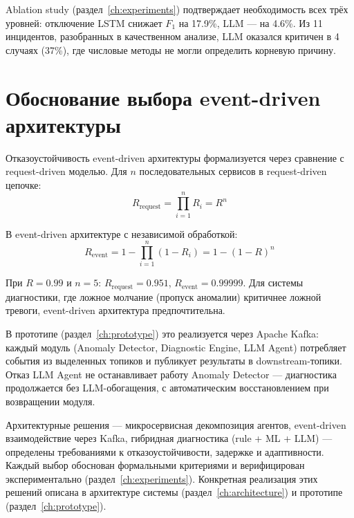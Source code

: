 Ablation study (раздел~\ref{ch:experiments}) подтверждает необходимость всех трёх уровней: отключение LSTM снижает $F_1$ на 17.9\%, LLM --- на 4.6\%. Из 11 инцидентов, разобранных в качественном анализе, LLM оказался критичен в 4 случаях (37\%), где числовые методы не могли определить корневую причину.

\section{Обоснование выбора event-driven архитектуры}

Отказоустойчивость event-driven архитектуры формализуется через сравнение с request-driven моделью. Для $n$ последовательных сервисов в request-driven цепочке:
\begin{equation}
R_{\text{request}} = \prod_{i=1}^{n} R_i = R^n
\label{eq:request_resilience_paradigm}
\end{equation}

В event-driven архитектуре с независимой обработкой:
\begin{equation}
R_{\text{event}} = 1 - \prod_{i=1}^{n}(1 - R_i) = 1 - (1 - R)^n
\label{eq:event_resilience_paradigm}
\end{equation}

При $R = 0.99$ и $n = 5$: $R_{\text{request}} = 0.951$, $R_{\text{event}} = 0.99999$. Для системы диагностики, где ложное молчание (пропуск аномалии) критичнее ложной тревоги, event-driven архитектура предпочтительна.

В прототипе (раздел~\ref{ch:prototype}) это реализуется через Apache Kafka: каждый модуль (Anomaly Detector, Diagnostic Engine, LLM Agent) потребляет события из выделенных топиков и публикует результаты в downstream-топики. Отказ LLM Agent не останавливает работу Anomaly Detector --- диагностика продолжается без LLM-обогащения, с автоматическим восстановлением при возвращении модуля.

\medskip

Архитектурные решения --- микросервисная декомпозиция агентов, event-driven взаимодействие через Kafka, гибридная диагностика (rule + ML + LLM) --- определены требованиями к отказоустойчивости, задержке и адаптивности. Каждый выбор обоснован формальными критериями и верифицирован экспериментально (раздел~\ref{ch:experiments}). Конкретная реализация этих решений описана в архитектуре системы (раздел~\ref{ch:architecture}) и прототипе (раздел~\ref{ch:prototype}).
